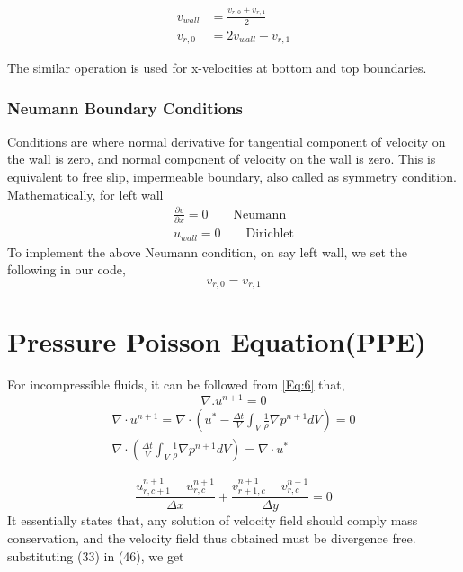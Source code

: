 \begin{equation*}
 \boxed {\begin{align}
  v_{wall} &= \frac{v_{r,0}+v_{r,1}}{2} \\
 v_{r,0}&= 2v_{wall}-v_{r,1}
 \end{align} }
\end{equation*}

The similar operation is used for x-velocities at bottom and top boundaries.

\subsubsection{Neumann Boundary Conditions}
\label{sec:bc}
Conditions are where normal derivative for tangential component of velocity on the wall is zero, and normal component of
velocity on the wall is zero. This is equivalent to free slip, impermeable boundary, also called as symmetry condition. Mathematically, for left wall
\begin{equation*}
 \boxed{ \begin{align}
\frac{\partial v}{\partial x} = 0 \qquad\text{Neumann} \\
 u_{wall} = 0	\qquad\text{Dirichlet}
 \end{align} }
\end{equation*}
To implement the above Neumann condition, on say left wall, we set the following in our code,
\begin{equation*}
 \boxed{ v_{r,0}= v_{r,1} }
\end{equation*}
  
  \section{Pressure Poisson Equation(PPE)}
  For incompressible fluids, it can be followed from \ref{Eq:6} that,
  \begin{equation}
 \nabla .u^{n+1} = 0
 \label{Eq:35}
\end{equation}
\begin{equation*}
\begin{align}
  \nabla \cdot u^{n+1} = \nabla \cdot \left(u^*-\frac{\Delta t}{V}\int_V\frac{1}{\rho}\nabla  p^{n+1} dV\right) = 0 \\
 \nabla \cdot \left(\frac{\Delta t}{V}\int_V\frac{1}{\rho}\nabla  p^{n+1} dV\right) = \nabla \cdot u^*
  \end{align}
\end{equation*}

  \begin{equation}
 \frac{u_{r,c+1}^{n+1}-u_{r,c}^{n+1}}{\Delta x} + \frac{v_{r+1,c}^{n+1}-v_{r,c}^{n+1}}{\Delta y} = 0
\end{equation}
It essentially states that, any solution of velocity field should comply mass conservation, and the velocity field thus obtained must be divergence free. 
substituting (33) in (46), we get

